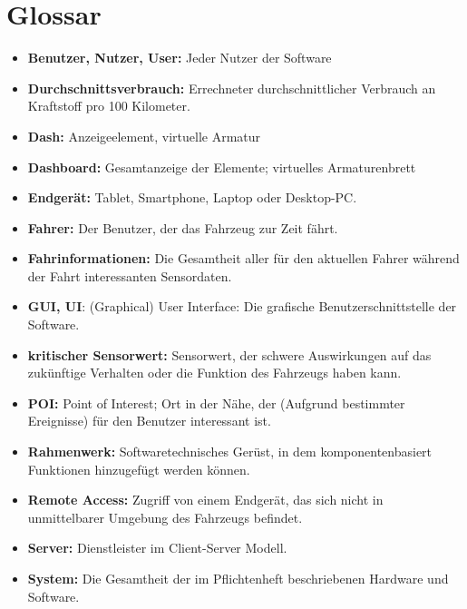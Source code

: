 \documentclass[pflichtenheft.tex]{subfiles}
\begin{document}
\chapter{Glossar}

\begin{itemize}

\item
\textbf{Benutzer, Nutzer, User:} Jeder Nutzer der Software

\item
\textbf{Durchschnittsverbrauch:} Errechneter durchschnittlicher Verbrauch an Kraftstoff pro 100 Kilometer.

\item
\textbf{Dash: } Anzeigeelement, virtuelle Armatur

\item
\textbf{Dashboard: } Gesamtanzeige der Elemente; virtuelles Armaturenbrett

\item
\textbf{Endgerät:} Tablet, Smartphone, Laptop oder Desktop-PC.

\item
\textbf{Fahrer:} Der Benutzer, der das Fahrzeug zur Zeit fährt.

\item
\textbf{Fahrinformationen:} Die Gesamtheit aller für den aktuellen Fahrer während der Fahrt interessanten Sensordaten.

\item
\textbf{GUI, UI}: (Graphical) User Interface: Die grafische Benutzerschnittstelle der Software.

\item
\textbf{kritischer Sensorwert:} Sensorwert, der schwere Auswirkungen auf das zukünftige Verhalten oder die Funktion des Fahrzeugs haben kann.

\item
\textbf{POI:} Point of Interest; Ort in der Nähe, der (Aufgrund bestimmter Ereignisse) für den Benutzer interessant ist.

\item
\textbf{Rahmenwerk: } Softwaretechnisches Gerüst, in dem komponentenbasiert Funktionen hinzugefügt werden können. 

\item
\textbf{Remote Access:} Zugriff von einem Endgerät, das sich nicht in unmittelbarer Umgebung des Fahrzeugs befindet.

\item
\textbf{Server:} Dienstleister im Client-Server Modell.

\item
\textbf{System:} Die Gesamtheit der im Pflichtenheft beschriebenen Hardware und Software.

\end{itemize}
\end{document}
